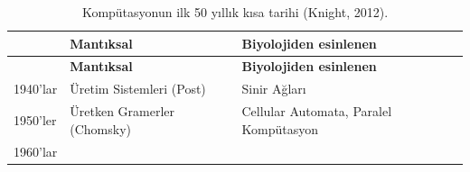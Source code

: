 \documentclass[12pt,turkish,a4paperpaper,]{report}
\begin{document}
\begin{longtable}[]{@{}lll@{}}
\caption{Kompütasyonun ilk 50 yıllık kısa tarihi (Knight, 2012).
\label{KompütasyonTarihi}}\tabularnewline
\toprule
\begin{minipage}[b]{0.10\columnwidth}\raggedright
\strut
\end{minipage} & \begin{minipage}[b]{0.36\columnwidth}\raggedright
\textbf{Mantıksal​}\strut
\end{minipage} & \begin{minipage}[b]{0.45\columnwidth}\raggedright
\textbf{Biyolojiden esinlenen}\strut
\end{minipage}\tabularnewline
\midrule
\endfirsthead
\toprule
\begin{minipage}[b]{0.10\columnwidth}\raggedright
\strut
\end{minipage} & \begin{minipage}[b]{0.36\columnwidth}\raggedright
\textbf{Mantıksal​}\strut
\end{minipage} & \begin{minipage}[b]{0.45\columnwidth}\raggedright
\textbf{Biyolojiden esinlenen}\strut
\end{minipage}\tabularnewline
\midrule
\endhead
\begin{minipage}[t]{0.10\columnwidth}\raggedright
1940'lar\strut
\end{minipage} & \begin{minipage}[t]{0.36\columnwidth}\raggedright
Üretim Sistemleri (Post)\strut
\end{minipage} & \begin{minipage}[t]{0.45\columnwidth}\raggedright
Sinir Ağları\strut
\end{minipage}\tabularnewline
\begin{minipage}[t]{0.10\columnwidth}\raggedright
1950'ler\strut
\end{minipage} & \begin{minipage}[t]{0.36\columnwidth}\raggedright
Üretken Gramerler (Chomsky)\strut
\end{minipage} & \begin{minipage}[t]{0.45\columnwidth}\raggedright
Cellular Automata, Paralel Kompütasyon\strut
\end{minipage}\tabularnewline
\begin{minipage}[t]{0.10\columnwidth}\raggedright
1960'lar\strut
\end{minipage} & \begin{minipage}[t]{0.36\columnwidth}\raggedright

\end{minipage}
\end{longtable}
\end{document}
